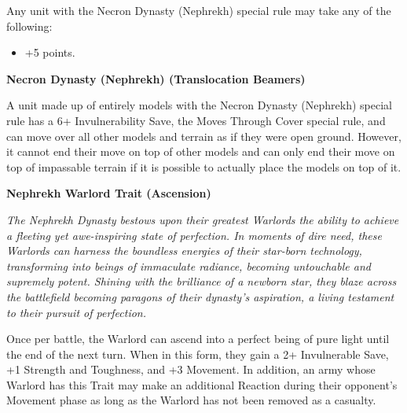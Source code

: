 Any unit with the Necron Dynasty (Nephrekh) special rule may take any of the following:
\begin{itemize}
	\item {} \dotfill +5 points.
\end{itemize}

\vspace*{2em}
\vspace*{1em}

\begin{multicols}{2}
	\textbf{Necron Dynasty (Nephrekh) (Translocation Beamers)} 
	
	A unit made up of entirely models with the Necron Dynasty (Nephrekh) special rule has a 6+ Invulnerability Save, the Moves Through Cover special rule, and can move over all other models and terrain as if they were open ground. However, it cannot end their move on top of other models and can only end their move on top of impassable terrain if it is possible to actually place the models on top of it.
	
	\textbf{Nephrekh Warlord Trait (Ascension)}
	
	\textit{The Nephrekh Dynasty bestows upon their greatest Warlords the ability to achieve a fleeting yet awe-inspiring state of perfection. In moments of dire need, these Warlords can harness the boundless energies of their star-born technology, transforming into beings of immaculate radiance, becoming untouchable and supremely potent. Shining with the brilliance of a newborn star, they blaze across the battlefield becoming paragons of their dynasty’s aspiration, a living testament to their pursuit of perfection.}
	
	Once per battle, the Warlord can ascend into a perfect being of pure light until the end of the next turn. When in this form, they gain a 2+ Invulnerable Save, +1 Strength and Toughness, and +3 Movement. In addition, an army whose Warlord has this Trait may make an additional Reaction during their opponent’s Movement phase as long as the Warlord has not been removed as a casualty.
\end{multicols}


